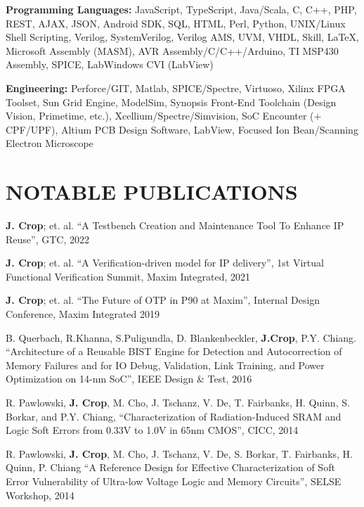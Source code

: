 \documentclass[line,margin]{res}
\begin{document}
\begin{resume}
\textbf{Programming Languages:} JavaScript, TypeScript, Java/Scala, C, C++, PHP, REST, AJAX, JSON, Android SDK, SQL, HTML, Perl, Python, UNIX/Linux Shell Scripting, Verilog, SystemVerilog, Verilog AMS, UVM, VHDL, Skill, \LaTeX, Microsoft Assembly (MASM), AVR Assembly/C/C++/Arduino, TI MSP430 Assembly, SPICE, LabWindows CVI (LabView)

\textbf{Engineering:} Perforce/GIT, Matlab, SPICE/Spectre, Virtuoso, Xilinx FPGA Toolset, Sun Grid Engine, ModelSim, Synopsis Front-End Toolchain (Design Vision, Primetime, etc.), Xcellium/Spectre/Simvision, SoC Encounter (+ CPF/UPF), Altium PCB Design Software, LabView, Focused Ion Bean/Scanning Electron Microscope


\section{NOTABLE PUBLICATIONS}

\textbf{J. Crop}; et. al. ``A Testbench Creation and Maintenance Tool To Enhance IP Reuse'', GTC, 2022

\textbf{J. Crop}; et. al. ``A Verification-driven model for IP delivery'', 1st Virtual Functional Verification Summit, Maxim Integrated, 2021

\textbf{J. Crop}; et. al. ``The Future of OTP in P90 at Maxim'', Internal Design Conference, Maxim Integrated 2019

B. Querbach, R.Khanna, S.Puligundla, D. Blankenbeckler, \textbf{J.Crop}, P.Y. Chiang. ``Architecture of a Reusable BIST Engine for Detection and Autocorrection of Memory Failures and for IO Debug, Validation, Link Training, and Power Optimization on 14-nm SoC'', IEEE Design \& Test, 2016

R. Pawlowski, \textbf{J. Crop}, M. Cho, J. Tschanz, V. De, T. Fairbanks, H. Quinn, S. Borkar, and P.Y. Chiang, ``Characterization of Radiation-Induced SRAM and Logic Soft Errors from 0.33V to 1.0V in 65nm CMOS'', CICC, 2014

R. Pawlowski, \textbf{J. Crop}, M. Cho, J. Tschanz, V. De, S. Borkar, T. Fairbanks, H. Quinn, P. Chiang ``A Reference Design for Effective Characterization of Soft Error Vulnerability of Ultra-low Voltage Logic and Memory Circuits'', SELSE Workshop, 2014



\end{resume}
\end{document}
